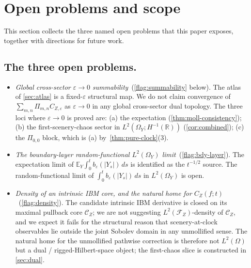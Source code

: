 \documentclass[EJP]{ejpecp}
\newcommand{\R}{\mathbb{R}}
\renewcommand{\E}{\mathbb{E}}
\newcommand{\IBM}{Z}
\newcommand{\Pir}{\Pi}
\begin{document}
\section{Open problems and scope}\label{sec:open}

This section collects the three named open problems that this paper
exposes, together with directions for future work.

\subsection*{The three open problems.}

\begin{itemize}
\item[\textbf{(F1)}] \emph{Global cross-sector $\varepsilon\to 0$
summability}~(\cref{flag:summability} below). The atlas of
\cref{sec:atlas} is a fixed-$\varepsilon$ structural map. We do not
claim convergence of
$\sum_{m,n}\Pir_{m,n}C_{\IBM,\varepsilon}$ as $\varepsilon\to 0$ in
any global cross-sector dual topology. The three loci where
$\varepsilon\to 0$ is proved are: (a) the expectation
(\cref{thm:moll-consistency}); (b) the first-scenery-chaos sector
in $L^{2}(\Omega_Y;H^{-1}(\R))$ (\cref{cor:combined}); (c) the
$\Pir_{0,0}$ block, which is (a) by~\cref{thm:pure-clock}(3).

\item[\textbf{(F2)}] \emph{The boundary-layer random-functional
$L^{2}(\Omega_Y)$ limit}~(\cref{flag:bdy-layer}). The
expectation limit of $\E_Y\!\int_0^t b_\varepsilon(|Y_s|)\,ds$ is
identified as the $t^{-1/2}$ source. The random-functional limit
of $\int_0^t b_\varepsilon(|Y_s|)\,ds$ in $L^{2}(\Omega_Y)$ is open.

\item[\textbf{(F3)}] \emph{Density of an intrinsic IBM core, and
the natural home for $C_\IBM(f;t)$}~(\cref{flag:density}). The
candidate intrinsic IBM derivative is closed on its maximal pullback
core $\mathcal C_\IBM$; we are not suggesting $L^{2}(\mathcal F_\IBM)$-density
of $\mathcal C_\IBM$, and we expect it fails for the structural
reason that scenery-at-clock observables lie outside the joint
Sobolev domain in any unmollified sense. The natural home for the
unmollified pathwise correction is therefore not $L^{2}(\Omega)$
but a dual / rigged-Hilbert-space object; the first-chaos slice is
constructed in \cref{sec:dual}.
\end{itemize}
\end{document}
